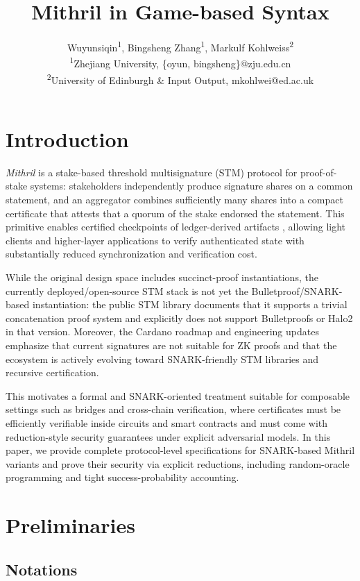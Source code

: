 \documentclass{article}
\title{Mithril in Game-based Syntax}
\author{
     Wuyunsiqin\textsuperscript{1},
    Bingsheng Zhang\textsuperscript{1},  Markulf Kohlweiss\textsuperscript{2}\\
    \textsuperscript{1}Zhejiang University, \{oyun, bingsheng\}@zju.edu.cn \\
    \textsuperscript{2}University of Edinburgh \& Input Output, mkohlwei@ed.ac.uk
}
\begin{document}
\maketitle



\section{Introduction}\label{sec:intro}

\emph{Mithril} is a stake-based threshold multisignature (STM) protocol for proof-of-stake systems: stakeholders independently produce signature shares on a common statement, and an aggregator combines sufficiently many shares into a compact certificate that attests that a quorum of the stake endorsed the statement. This primitive enables certified checkpoints of ledger-derived artifacts 
, allowing light clients and higher-layer applications to verify authenticated state with substantially reduced synchronization and verification cost. 

While the original design space includes succinct-proof instantiations, the currently deployed/open-source STM stack is not yet the Bulletproof/SNARK-based instantiation: the public STM library documents that it supports a trivial concatenation proof system and explicitly does not support Bulletproofs or Halo2 in that version. Moreover, the Cardano roadmap and engineering updates emphasize that current signatures are not suitable for ZK proofs and that the ecosystem is actively evolving toward SNARK-friendly STM libraries and recursive certification.

This motivates a formal and SNARK-oriented treatment suitable for composable settings such as bridges and cross-chain verification, where certificates must be efficiently verifiable inside circuits and smart contracts and must come with reduction-style security guarantees under explicit adversarial models. In this paper, we provide complete protocol-level specifications for SNARK-based Mithril variants and prove their security via explicit reductions, including random-oracle programming and tight success-probability accounting. 

\section{Preliminaries}
\subsection{Notations}
\end{document}
